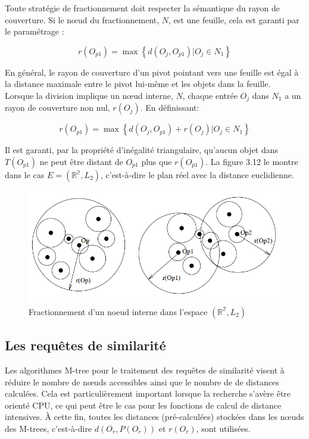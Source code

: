 Toute stratégie de fractionnement doit respecter la sémantique du rayon de couverture. Si le nœud du fractionnement, $ N $, est une feuille, cela est garanti par le paramétrage :

\begin{equation}
	r(O_{p1}) = \max \left\{d(O_j, O_{p1}) | O_j \in N_1 \right\}
\end{equation}

En général, le rayon de couverture d'un pivot pointant vers une feuille est égal à la distance maximale entre le pivot lui-même et les objets dans la feuille.\\

Lorsque la division implique un nœud interne, $ N $, chaque entrée $ O_j $ dans $ N_1 $ a un rayon de couverture non nul, $ r(O_j) $. En définissant:

\begin{equation}
r(O_{p1}) = \max \left\{d(O_j, O_{p1}) + r(O_j) | O_j \in N_1 \right\}
\end{equation}

Il est garanti, par la propriété d'inégalité triangulaire, qu'aucun objet dans $ T(O_{p1}) $ ne peut être distant de $  O_{p1} $ plus que $ r(O_{p1}) $. La figure 3.12 le montre dans le cas $ E = ( \mathbb{R^2}, L_2) $, c'est-à-dire le plan réel avec la distance euclidienne.
\begin{figure}[H]
	\centering
	\includegraphics[width=.6 \textwidth]{Figures/splitexep.png} %
	\caption{Fractionnement d'un noeud interne dans l'espace  $ ( \mathbb{R^2}, L_2) $}
\end{figure} 

\subsection{Les requêtes de similarité}
Les algorithmes M-tree pour le traitement des requêtes de similarité visent à réduire le nombre de nœuds accessibles ainsi que le nombre de  de distances calculées. Cela est particulièrement important lorsque la recherche s'avère être orienté CPU, ce qui peut être le cas pour les fonctions de calcul de distance intensives. À cette fin, toutes les distances (pré-calculées) stockées dans les nœuds des M-trees, c'est-à-dire $ d(O_r, P(O_r)) $ et $ r(O_r) $, sont utilisées.

